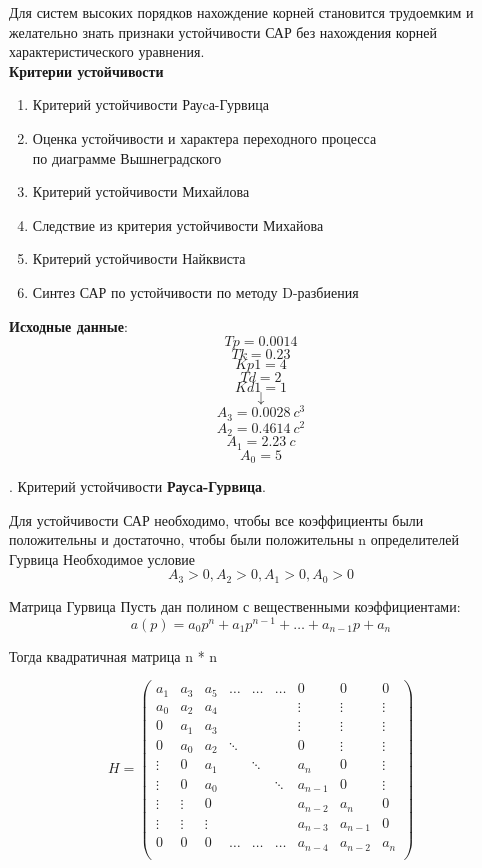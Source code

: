 \documentclass[12pt, a4paper]{report}
\def\Tp{0.0014}
\def\Tk{0.23}
\def\Kp1{4}
\def\Td{2}
\def\Kd1{1}
\def\AAAA{0.0028}
\def\AAA{0.4614}
\def\AA{2.23}
\def\A{5}
\begin{document}
Для систем высоких порядков нахождение корней становится трудоемким и желательно знать признаки устойчивости
САР без нахождения корней характеристического уравнения.\\

\textbf{Критерии устойчивости}
\begin{enumerate}
 \item Критерий устойчивости Рауcа-Гурвица
 \item Оценка устойчивости и характера переходного процесса\\по диаграмме Вышнеградского
 \item Критерий устойчивости Михайлова
 \item Следствие из критерия устойчивости Михайова
 \item Критерий устойчивости Найквиста
 \item Синтез САР по устойчивости по методу D-разбиения
\end{enumerate}

\textbf{Исходные данные}:
$$ Tp = \Tp $$
$$ Tk = \Tk $$
$$ Kp1 = \Kp1 $$
$$ Td = \Td $$
$$ Kd1 = \Kd1 $$
$$ \downarrow $$
$$ A_{3} = \AAAA \:c^{3} $$
$$ A_{2} = \AAA \:c^{2}$$
$$ A_{1} = \AA \:c$$
$$ A_{0} = \A $$

. Критерий устойчивости \textbf{Рауcа-Гурвица}.

Для устойчивости САР необходимо, чтобы все коэффициенты были положительны и достаточно, чтобы были положительны n определителей Гурвица
Необходимое условие
$$ A_{3} > 0, A_{2} > 0, A_{1} > 0, A_{0} > 0 $$

Матрица Гурвица
Пусть дан полином с вещественными коэффициентами: $$ a(p) = a_{0}p^n + a_{1}p^{n-1} + \ldots + a_{n-1}p + a_{n}$$

Тогда квадратичная матрица n * n

$$
    H = \begin{pmatrix}
        a_{1}  &a_{3}  &a_{5}  &\dots  &\dots  &\dots  &0      &0      &0\\
        a_{0}  &a_{2}  &a_{4}  &       &       &       &\vdots  &\vdots  &\vdots \\
        0      &a_{1}  &a_{3}  &       &       &       &\vdots  &\vdots  &\vdots \\
        0      &a_{0}  &a_{2}  &\ddots &       &       &0       &\vdots  &\vdots \\
        \vdots &0      &a_{1}  &       &\ddots &       &a_{n}   &0       &\vdots \\
        \vdots &0      &a_{0}  &       &       &\ddots &a_{n-1} &0       &\vdots \\
        \vdots &\vdots &0      &       &       &       &a_{n-2} &a_{n}   &0      \\
        \vdots &\vdots &\vdots &       &       &       &a_{n-3} &a_{n-1} &0      \\
        0      &0      &0      &\dots  &\dots  &\dots  &a_{n-4} &a_{n-2} &a_{n}  \\
        \end{pmatrix}
$$
\end{document}
